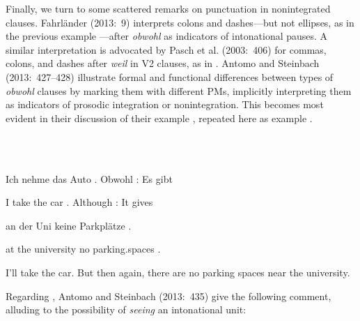 \begin{styleMoutonTextBeforeExample}
Finally, we turn to some scattered remarks on punctuation in nonintegrated clauses. Fahrländer (2013:~9) interprets colons and dashes—but not ellipses, as in the previous example —after \textit{obwohl} as indicators of intonational pauses. A similar interpre\-tation is advocated by Pasch et al. (2003:~406) for commas, colons, and dashes after \textit{weil} in V2 clauses, as in . Antomo and Steinbach (2013:~427–428) illustrate formal and functional differences between types of \textit{obwohl} clauses by marking them with different PMs, implicitly interpreting them as indicators of prosodic integration or nonintegration. This becomes most evident in their discussion of their example , repeated here as example .
\end{styleMoutonTextBeforeExample}

\begin{styleMoutonExample}
\ea%
    \label{ex:key:5}
    \gll\\
        \\
    \glt
    \z

          Ich  nehme  das  Auto  .  Obwohl  :  Es  gibt
\end{styleMoutonExample}

\begin{styleMoutonExampleAlpha}
I  take    the  car  .  Although  :  It  gives
\end{styleMoutonExampleAlpha}

\begin{styleMoutonExampleAlpha}
an  der  Uni    keine  Parkplätze    .
\end{styleMoutonExampleAlpha}

\begin{styleMoutonExampleAlpha}
at  the  university  no  parking.spaces  .
\end{styleMoutonExampleAlpha}

\begin{styleMoutonExampleTrans}
I’ll take the car. But then again, there are no parking spaces near the uni\-versity.
\end{styleMoutonExampleTrans}

\begin{styleMoutonTextAfterExample}
Regarding , Antomo and Steinbach (2013:~435) give the following comment, alluding to the possibility of \textit{seeing} an intonational unit:
\end{styleMoutonTextAfterExample}

